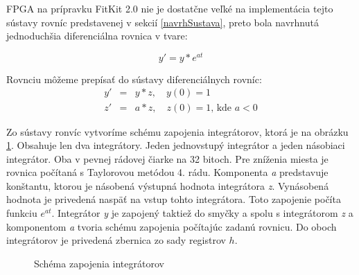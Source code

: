 

FPGA na prípravku FitKit 2.0 nie je dostatčne veľké na implementácia tejto  sústavy rovníc predstavenej v sekcií \ref{navrhSustava}, preto bola navrhnutá jednoduchšia diferenciálna rovnica v tvare:

\begin{equation}
y' = y * e^{at} \label{rovnica}
\end{equation}

Rovnciu môžeme prepísať do sústavy diferenciálnych rovníc:
\begin{eqnarray}
y' & = & y * z , \quad y(0) = 1 \label{rovnicasustava} \\
z' & = & a * z , \quad z(0) = 1 \text{, kde } a < 0 \nonumber
\end{eqnarray}

Zo sústavy ronvíc vytvoríme schému zapojenia integrátorov, ktorá je na obrázku \ref{ppi_fp_sustava_impl}. Obsahuje len dva integrátory. Jeden jednovstupý integrátor a jeden násobiaci integrátor. Oba v pevnej rádovej čiarke na 32 bitoch. Pre zníženia miesta je rovnica počítaná s Taylorovou metódou 4. rádu. Komponenta \textit{a} predstavuje konštantu, ktorou je násobená výstupná hodnota integrátora \textit{z}. Vynásobená hodnota je privedená naspäť na vstup tohto integrátora. Toto zapojenie počíta funkciu $ e^{at} $. Integrátor \textit{y} je zapojený taktiež do smyčky a spolu s integrátorom \textit{z} a komponentom \textit{a} tvoria schému zapojenia počítajúc zadanú rovnicu. Do oboch integrátorov je privedená zbernica zo sady registrov $ h $.

\begin{figure}[H]
\centering
{}
\caption{Schéma zapojenia integrátorov}
\label{ppi_fp_sustava_impl}
\end{figure}


